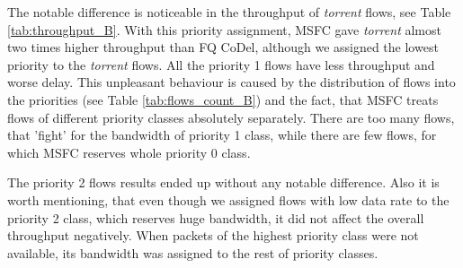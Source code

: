 



The notable difference is noticeable in the throughput of \emph{torrent} flows, see Table \ref{tab:throughput_B}. With this priority assignment, MSFC gave \emph{torrent} almost two times higher throughput than FQ CoDel, although we assigned the lowest priority to the \emph{torrent} flows. All the priority 1 flows have less throughput and worse delay. This unpleasant behaviour is caused by the distribution of flows into the priorities (see Table \ref{tab:flows_count_B}) and the fact, that MSFC treats flows of different priority classes absolutely separately. There are too many flows, that 'fight' for the bandwidth of priority 1 class, while there are few flows, for which MSFC reserves whole priority 0 class.

The priority 2 flows results ended up without any notable difference. Also it is worth mentioning, that even though we assigned flows with low data rate to the priority 2 class, which reserves huge bandwidth, it did not affect the overall throughput negatively. When packets of the highest priority class were not available, its bandwidth was assigned to the rest of priority classes.





